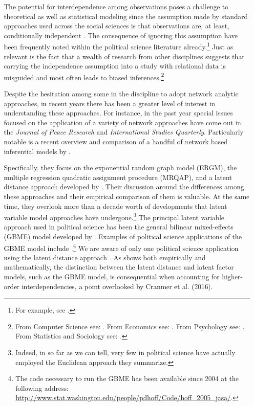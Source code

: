 \documentclass[12pt,pdflatex]{elsarticle}
\begin{document}
The potential for interdependence among observations poses a challenge to theoretical as well as statistical modeling since the assumption made by standard approaches used across the social sciences is that observations are, at least, conditionally independent \citep{snijders:2011}. The consequence of ignoring this assumption have been frequently noted within the political science literature already.\footnote{For example, see \citet{beck:etal:1998,signorino:1999,hoff:ward:2004,franzese:hayes:2007,cranmer:desmarais:2011,erikson:pinto:2014}.}  Just as relevant is the fact that a wealth of research from other disciplines suggests that carrying the independence assumption into a study with relational data is misguided and most often leads to biased inferences.\footnote{From Computer Science see: \citet{bonabeau:2002,brandes:erlebach:2005}. From Economics see: \citet{goyal:2012,jackson:2014}. From Psychology see: \citet{pattison:wasserman:1999,kenny:etal:2006}. From Statistics and Sociology see: \citet{snijders:1996,hoff:etal:2002}.} 

Despite the hesitation among some in the discipline to adopt network analytic approaches, in recent years there has been a greater level of interest in understanding these approaches. For instance, in the past year special issues focused on the application of a variety of network approaches have come out in the \textit{Journal of Peace Research} and \textit{International Studies Quarterly}. Particularly notable is a recent overview and comparison of a handful of network based inferential models by \citet{cranmer:etal:2016}.

Specifically, they focus on the exponential random graph model (ERGM), the multiple regression quadratic assignment procedure (MRQAP), and a latent distance approach developed by \citet{hoff:etal:2002}. Their discussion around the differences among these approaches and their empirical comparison of them is valuable. At the same time, they overlook more than a decade worth of developments that latent variable model approaches have undergone.\footnote{Indeed, in so far as we can tell, very few in political science have actually employed the Euclidean approach they summarize.} The principal latent variable approach used in political science has been the general bilinear mixed-effects (GBME) model developed by \citet{hoff:2005}. Examples of political science applications of the GBME model include \citet{hoff:ward:2004,ward:etal:2007,cao:2009,cao:2010, cao:2012,breunig:etal:2012,ward:etal:2012,cao:ward:2014,metternich:etal:2015,greenhill:2015}.\footnote{The code necessary to run the GBME has been available since 2004 at the following address: \url{http://www.stat.washington.edu/people/pdhoff/Code/hoff_2005_jasa/}.} We are aware of only one political science application using the latent distance approach  \citep{kirkland:2012}. As \citet{hoff:2008} shows both empirically and mathematically, the distinction between the latent distance and latent factor models, such as the GBME model, is consequential when accounting for higher-order interdependencies, a point overlooked by Cranmer et al. (2016).
\end{document}

